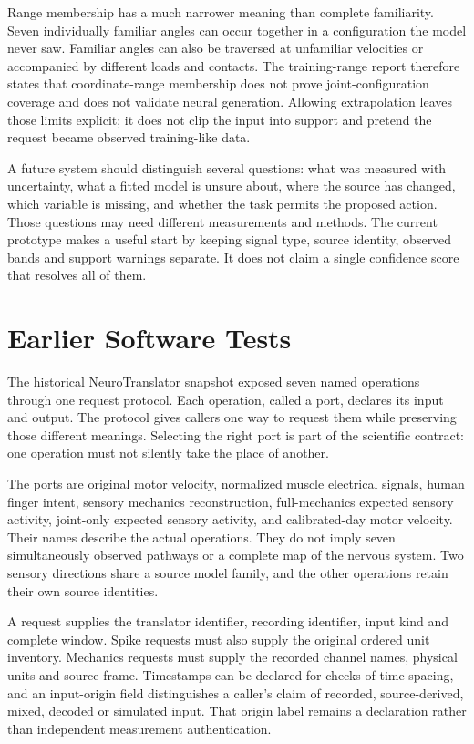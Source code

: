 Range membership has a much narrower meaning than complete familiarity. Seven individually familiar angles can occur together in a configuration the model never saw. Familiar angles can also be traversed at unfamiliar velocities or accompanied by different loads and contacts. The training-range report therefore states that coordinate-range membership does not prove joint-configuration coverage and does not validate neural generation. Allowing extrapolation leaves those limits explicit; it does not clip the input into support and pretend the request became observed training-like data.

A future system should distinguish several questions: what was measured with uncertainty, what a fitted model is unsure about, where the source has changed, which variable is missing, and whether the task permits the proposed action. Those questions may need different measurements and methods. The current prototype makes a useful start by keeping signal type, source identity, observed bands and support warnings separate. It does not claim a single confidence score that resolves all of them.

\section{Earlier Software Tests}

The historical NeuroTranslator snapshot exposed seven named operations through one request protocol. Each operation, called a port, declares its input and output. The protocol gives callers one way to request them while preserving those different meanings. Selecting the right port is part of the scientific contract: one operation must not silently take the place of another.

The ports are original motor velocity, normalized muscle electrical signals, human finger intent, sensory mechanics reconstruction, full-mechanics expected sensory activity, joint-only expected sensory activity, and calibrated-day motor velocity. Their names describe the actual operations. They do not imply seven simultaneously observed pathways or a complete map of the nervous system. Two sensory directions share a source model family, and the other operations retain their own source identities.

A request supplies the translator identifier, recording identifier, input kind and complete window. Spike requests must also supply the original ordered unit inventory. Mechanics requests must supply the recorded channel names, physical units and source frame. Timestamps can be declared for checks of time spacing, and an input-origin field distinguishes a caller's claim of recorded, source-derived, mixed, decoded or simulated input. That origin label remains a declaration rather than independent measurement authentication.

